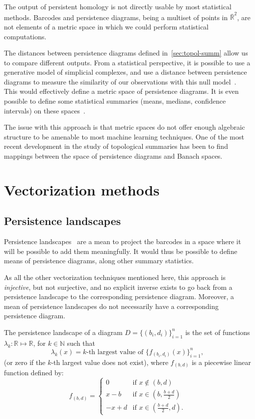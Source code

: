 \documentclass[a4paper,11pt,openany,extrafontsizes]{memoir}
\begin{document}
The output of persistent homology is not directly usable by most
statistical methods. Barcodes and persistence diagrams, being a
multiset of points in $\overline{\mathbb{R}}^2$, are not elements of a
metric space in which we could perform statistical computations.

The distances between persistence diagrams defined
in~\autoref{sec:topol-summ} allow us to compare different
outputs. From a statistical perspective, it is possible to use a
generative model of simplicial complexes, and use a distance between
persistence diagrams to measure the similarity of our observations
with this null model~\cite{adler_persistent_2010}. This would
effectively define a metric space of persistence diagrams. It is even
possible to define some statistical summaries (means, medians,
confidence intervals) on these
spaces~\cite{turner_frechet_2014,munch_probabilistic_2015}.

The issue with this approach is that metric spaces do not offer enough
algebraic structure to be amenable to most machine learning
techniques. One of the most recent development in the study of
topological summaries has been to find mappings between the space of
persistence diagrams and Banach spaces.

\section{Vectorization methods}%
\label{sec:vect-meth}


\subsection{Persistence landscapes}

Persistence landscapes~\cite{bubenik_statistical_2015} are a mean to
project the barcodes in a space where it will be possible to add them
meaningfully. It would thus be possible to define means of persistence
diagrams, along other summary statistics.

As all the other vectorization techniques mentioned here, this
approach is \emph{injective}, but not surjective, and no explicit
inverse exists to go back from a persistence landscape to the
corresponding persistence diagram. Moreover, a mean of persistence
landscapes do not necessarily have a corresponding persistence
diagram.

\begin{defn}
  The persistence landscape of a diagram $D = \{(b_i,d_i)\}_{i=1}^n$
  is the set of functions $\lambda_k: \mathbb{R} \mapsto \mathbb{R}$,
  for $k\in\mathbb{N}$ such that
  \[ \lambda_k(x) = k\text{-th largest value of } \{f_{(b_i,
      d_i)}(x)\}_{i=1}^n, \] (or zero if the $k$-th largest value does
  not exist), where $f_{(b,d)}$ is a piecewise linear function defined by:
  \[ f_{(b,d)} =
    \begin{cases}
      0& \text{if }x \notin (b,d)\\
      x-b& \text{if }x\in (b,\frac{b+d}{2})\\
      -x+d& \text{if }x\in (\frac{b+d}{2},d).
    \end{cases}
  \]
\end{defn}
\end{document}
